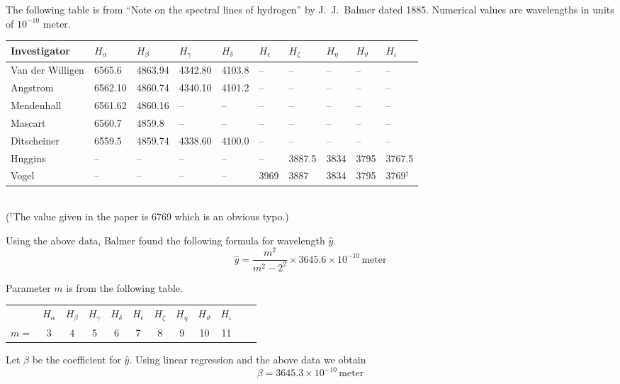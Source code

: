 \documentclass[12pt]{article}
\begin{document}
\noindent
The following table is from
``Note on the spectral lines of hydrogen''
by J.~J.~Balmer dated 1885.
Numerical values are wavelengths in units of $10^{-10}$ meter.
\begin{center}
\footnotesize
\begin{tabular}{|l|l|l|l|l|l|l|l|l|l|}
\hline
Investigator & $H_\alpha$ & $H_\beta$ & $H_\gamma$ & $H_\delta$ & $H_\epsilon$ &
$H_\zeta$ & $H_\eta$ & $H_\vartheta$ & $H_\iota$
\\
\hline
Van der Willigen & 6565.6 & 4863.94 & 4342.80 & 4103.8 & -- & -- & -- & -- & --
\\
Angstrom & 6562.10 & 4860.74 & 4340.10 & 4101.2 & -- & -- & -- & -- & --
\\
Mendenhall & 6561.62 & 4860.16 & -- & -- & -- & -- & -- & -- & --
\\
Mascart & 6560.7 & 4859.8 & -- & -- & -- & -- & -- & -- & --
\\
Ditscheiner & 6559.5 & 4859.74 & 4338.60 & 4100.0 & -- & -- & -- & -- & --
\\
Huggins & -- & -- & -- & -- & -- & 3887.5 & 3834 & 3795 & 3767.5
\\
Vogel & -- & -- & -- & -- & 3969 & 3887 & 3834 & 3795 & 3769${}^\dag$
\\
\hline
\end{tabular}
\\
{\footnotesize(${}^\dag$The value given in the paper is 6769 which is an obvious typo.)}
\end{center}

\noindent
Using the above data, Balmer found the following formula
for wavelength $\hat y$.
\begin{equation*}
\hat{y}=\frac{m^2}{m^2-2^2}\times3645.6\times10^{-10}\,\text{meter}
\end{equation*}

\noindent
Parameter $m$ is from the following table.
\begin{center}
\begin{tabular}{cccccccccccc}
& $H_\alpha$ & $H_\beta$ & $H_\gamma$ & $H_\delta$ & $H_\epsilon$ &
$H_\zeta$ & $H_\eta$ & $H_\vartheta$ & $H_\iota$
\\
$m=$ & 3 & 4 & 5 & 6 & 7 & 8 & 9 & 10 & 11
\end{tabular}
\end{center}

\noindent
Let $\beta$ be the coefficient for $\hat y$.
Using linear regression and the above data we obtain
\begin{equation*}
\beta=3645.3\times10^{-10}\,\text{meter}
\end{equation*}
\end{document}
